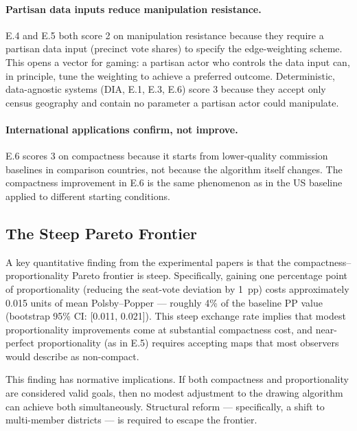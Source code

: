 \paragraph{Partisan data inputs reduce manipulation resistance.}
E.4 and E.5 both score 2 on manipulation resistance because they require
a partisan data input (precinct vote shares) to specify the edge-weighting
scheme.  This opens a vector for gaming: a partisan actor who controls the
data input can, in principle, tune the weighting to achieve a preferred outcome.
Deterministic, data-agnostic systems (DIA, E.1, E.3, E.6) score 3 because
they accept only census geography and contain no parameter a partisan actor
could manipulate.

\paragraph{International applications confirm, not improve.}
E.6 scores 3 on compactness because it starts from lower-quality commission
baselines in comparison countries, not because the algorithm itself changes.
The compactness improvement in E.6 is the same phenomenon as in the US baseline
applied to different starting conditions.

\subsection{The Steep Pareto Frontier}

A key quantitative finding from the experimental papers is that the
compactness--proportionality Pareto frontier is steep.  Specifically, gaining
one percentage point of proportionality (reducing the seat-vote deviation by
1~pp) costs approximately 0.015 units of mean Polsby--Popper --- roughly 4\%
of the baseline PP value \citep{dellaLibera2026e5} (bootstrap 95\% CI:
[0.011, 0.021]).  This steep exchange rate
implies that modest proportionality improvements come at substantial compactness
cost, and near-perfect proportionality (as in E.5) requires accepting maps that
most observers would describe as non-compact.

This finding has normative implications.  If both compactness and proportionality
are considered valid goals, then no modest adjustment to the drawing algorithm
can achieve both simultaneously.  Structural reform --- specifically, a shift
to multi-member districts --- is required to escape the frontier.
